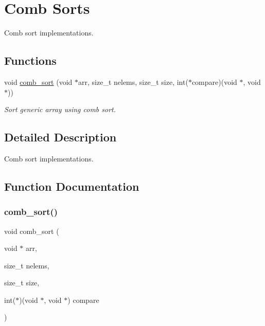 \hypertarget{group__CombSort}{}\section{Comb Sorts}
\label{group__CombSort}


Comb sort implementations.  


\subsection*{Functions}
\begin{DoxyCompactItemize}
\item 
void \hyperlink{group__CombSort_ga619c6623faf56c2add4d8bd9e796b3dc}{comb\+\_\+sort} (void $\ast$arr, size\+\_\+t nelems, size\+\_\+t size, int($\ast$compare)(void $\ast$, void $\ast$))
\begin{DoxyCompactList}\small\item\em Sort generic array using comb sort. \end{DoxyCompactList}\end{DoxyCompactItemize}


\subsection{Detailed Description}
Comb sort implementations. 



\subsection{Function Documentation}
\mbox{\label{group__CombSort_ga619c6623faf56c2add4d8bd9e796b3dc}} 
\subsubsection{\texorpdfstring{comb\+\_\+sort()}{comb\_sort()}}
{\footnotesize\ttfamily void comb\+\_\+sort (\begin{DoxyParamCaption}\item[{void $\ast$}]{arr,  }\item[{size\+\_\+t}]{nelems,  }\item[{size\+\_\+t}]{size,  }\item[{int($\ast$)(void $\ast$, void $\ast$)}]{compare }\end{DoxyParamCaption})}



